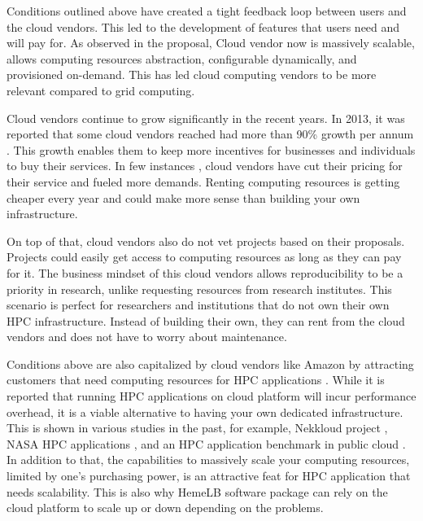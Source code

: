 Conditions outlined above have created a tight feedback loop between users and the cloud vendors. This led to the development of features that users need and will pay for. As observed in the proposal, Cloud vendor now is massively scalable, allows computing resources abstraction, configurable dynamically, and provisioned on-demand. This has led cloud computing vendors to be more relevant compared to grid computing.

Cloud vendors continue to grow significantly in the recent years. In 2013, it was reported that some cloud vendors reached had more than 90\% growth per annum \citep{FSN.O51:online}. This growth enables them to keep more incentives for businesses and individuals to buy their services. In few instances \citep{AWSPr74:online, Annou90:online, Googl18:online}, cloud vendors have cut their pricing for their service and fueled more demands. Renting computing resources is getting cheaper every year and could make more sense than building your own infrastructure.

On top of that, cloud vendors also do not vet projects based on their proposals. Projects could easily get access to computing resources as long as they can pay for it. The business mindset of this cloud vendors allows reproducibility to be a priority in research, unlike requesting resources from research institutes.  This scenario is perfect for researchers and institutions that do not own their own HPC infrastructure. Instead of building their own, they can rent from the cloud vendors and does not have to worry about maintenance.

Conditions above are also capitalized by cloud vendors like Amazon by attracting customers that need computing resources for HPC applications \citep{Micro31:online}. While it is reported that running HPC applications on cloud platform will incur performance overhead, it is a viable alternative to having your own dedicated infrastructure. This is shown in various studies in the past, for example, Nekkloud project \citep{cohen2013nekkloud}, NASA HPC applications \citep{mehrotra2012performance}, and an HPC application benchmark in public cloud \citep{he2010case}. In addition to that, the capabilities to massively scale your computing resources, limited by one's purchasing power, is an attractive feat for HPC application that needs scalability. This is also why HemeLB software package can rely on the cloud platform to scale up or down depending on the problems. 



